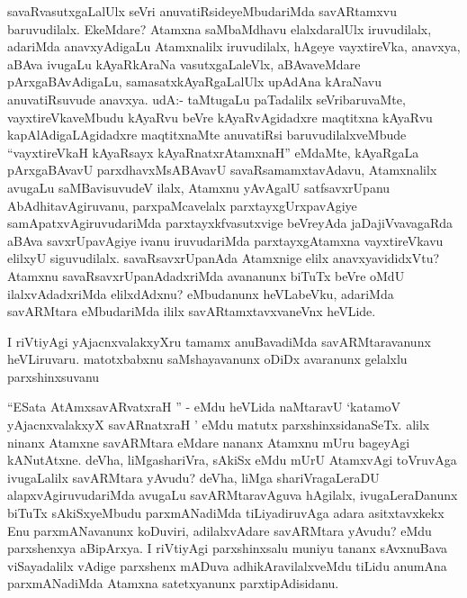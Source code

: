 \begin{artha}
savaRvasutxgaLalUlx seVri anuvatiRsideyeMbudariMda savARtamxvu baruvudilalx. EkeMdare? Atamxna saMbaMdhavu elalxdaralUlx iruvudilalx, adariMda anavxyAdigaLu Atamxnalilx iruvudilalx, hAgeye vayxtireVka, anavxya, aBAva ivugaLu kAyaRkAraNa vasutxgaLaleVlx, aBAvaveMdare pArxgaBAvAdigaLu, samasatxkAyaRgaLalUlx upAdAna kAraNavu anuvatiRsuvude anavxya. udA:- taMtugaLu paTadalilx seVribaruvaMte, vayxtireVkaveMbudu kAyaRvu beVre kAyaRvAgidadxre maqtitxna kAyaRvu kapAlAdigaLAgidadxre maqtitxnaMte anuvatiRsi baruvudilalxveMbude ``vayxtireVkaH kAyaRsayx kAyaRnatxrAtamxnaH'' eMdaMte, kAyaRgaLa pArxgaBAvavU parxdhavxMsABAvavU savaRsamamxtavAdavu, Atamxnalilx avugaLu saMBavisuvudeV ilalx, Atamxnu yAvAgalU satfsavxrUpanu AbAdhitavAgiruvanu, parxpaMcavelalx parxtayxgUrxpavAgiye samApatxvAgiruvudariMda parxtayxkfvasutxvige beVreyAda jaDajiVvavagaRda aBAva savxrUpavAgiye ivanu iruvudariMda parxtayxgAtamxna vayxtireVkavu elilxyU siguvudilalx. savaRsavxrUpanAda Atamxnige elilx anavxyavididxVtu? Atamxnu savaRsavxrUpanAdadxriMda avananunx biTuTx beVre oMdU ilalxvAdadxriMda elilxdAdxnu? eMbudanunx heVLabeVku, adariMda savARMtara eMbudariMda ililx savARtamxtavxvaneVnx heVLide.
\end{artha}

\begin{artha}
I riVtiyAgi yAjacnxvalakxyXru tamamx anuBavadiMda savARMtaravanunx heVLiruvaru. matotxbabxnu saMshayavanunx oDiDx avaranunx gelalxlu parxshinxsuvanu \mdash 
\end{artha}


\begin{artha}
``ESata AtAmxsavARvatxraH '' - eMdu heVLida naMtaravU `katamoV yAjacnxvalakxyX savARnatxraH ' eMdu matutx parxshinxsidanaSeTx. alilx ninanx Atamxne savARMtara eMdare nananx Atamxnu mUru bageyAgi kANutAtxne. deVha, liMgashariVra, sAkiSx eMdu mUrU AtamxvAgi toVruvAga ivugaLalilx savARMtara yAvudu? deVha, liMga shariVragaLeraDU alapxvAgiruvudariMda avugaLu savARMtaravAguva hAgilalx, ivugaLeraDanunx biTuTx sAkiSxyeMbudu parxmANadiMda tiLiyadiruvAga adara asitxtavxkekx Enu parxmANavanunx koDuviri, adilalxvAdare savARMtara yAvudu? eMdu parxshenxya aBipArxya. I riVtiyAgi parxshinxsalu muniyu tananx sAvxnuBava viSayadalilx vAdige parxshenx mADuva adhikAravilalxveMdu tiLidu anumAna parxmANadiMda Atamxna satetxyanunx parxtipAdisidanu. 
\end{artha}

